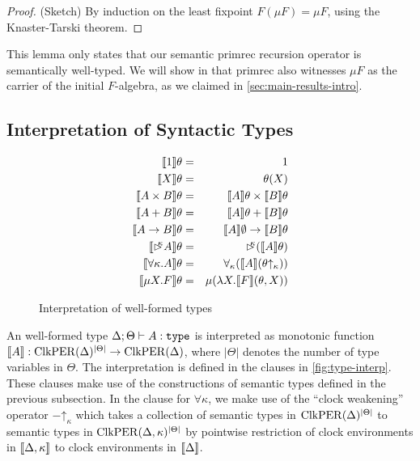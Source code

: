 \begin{proof}
  (Sketch) By induction on the least fixpoint $F(\mu F) = \mu F$,
  using the Knaster-Tarski theorem.
\end{proof}

This lemma only states that our semantic $\mathrm{primrec}$ recursion
operator is semantically well-typed. We will show in
 that $\mathrm{primrec}$ also witnesses
$\mu F$ as the carrier of the initial $F$-algebra, as we claimed in
\autoref{sec:main-results-intro}.

\subsection{Interpretation of Syntactic Types}\label{sec:type-interp}

\begin{figure}[t]
  \centering
  \begin{eqnarray*}
    \llbracket 1 \rrbracket\theta & = & 1 \\
    \llbracket X \rrbracket\theta & = & \theta(X) \\
    \llbracket A \times B \rrbracket\theta & = & \llbracket A \rrbracket\theta \times \llbracket B \rrbracket\theta \\
    \llbracket A + B \rrbracket\theta & = & \llbracket A \rrbracket\theta + \llbracket B \rrbracket\theta \\
    \llbracket A \to B \rrbracket\theta & = & \llbracket A \rrbracket\emptyset \to \llbracket B \rrbracket\theta \\
    \llbracket \mathord{\rhd\kern-0.4em^{\kappa}} A \rrbracket\theta & = & \mathord{\rhd\kern-0.4em^{\kappa}} (\llbracket A \rrbracket\theta) \\
    \llbracket \forall \kappa. A \rrbracket\theta & = & \forall_\kappa (\llbracket A \rrbracket(\theta\mathord\uparrow_\kappa)) \\
    \llbracket \mu X. F \rrbracket\theta & = & \mu (\lambda X. \llbracket F \rrbracket(\theta, X))
  \end{eqnarray*}
  \caption{Interpretation of well-formed types}
  \label{fig:type-interp}
\end{figure}

An well-formed type $\Delta; \Theta \vdash A : \texttt{\textup{type}}$ is
interpreted as monotonic function $\llbracket A \rrbracket :
\mathrm{ClkPER}(\Delta)^{|\Theta|} \to \mathrm{ClkPER}(\Delta)$, where $|\Theta|$
denotes the number of type variables in $\Theta$. The interpretation
is defined in the clauses in \autoref{fig:type-interp}. These clauses
make use of the constructions of semantic types defined in the
previous subsection. In the clause for $\forall \kappa$, we make use
of the ``clock weakening'' operator $-\mathord\uparrow_\kappa$ which
takes a collection of semantic types in $\mathrm{ClkPER}(\Delta)^{|\Theta|}$
to semantic types in $\mathrm{ClkPER}(\Delta,\kappa)^{|\Theta|}$ by pointwise
restriction of clock environments in $\llbracket \Delta, \kappa \rrbracket$ to clock
environments in $\llbracket \Delta \rrbracket$.

